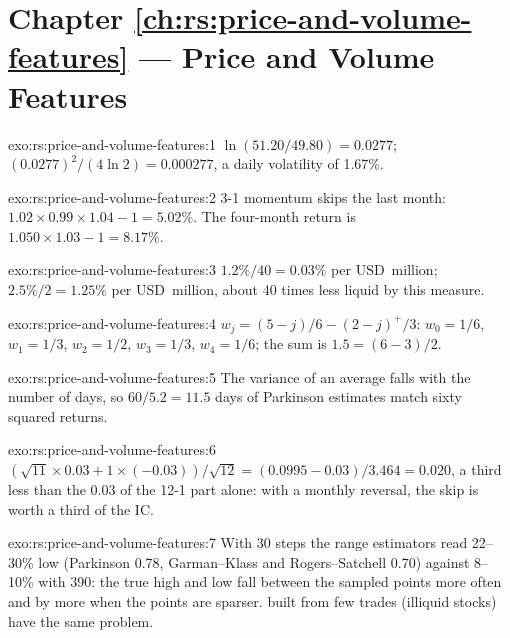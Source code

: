 \section*{Chapter \ref{ch:rs:price-and-volume-features} --- Price and Volume Features}

\begin{solution}{exo:rs:price-and-volume-features:1}
$\ln(51.20/49.80) = 0.0277$; $(0.0277)^2/(4\ln2) = 0.000277$, a daily volatility of 1.67\%.
\end{solution}

\begin{solution}{exo:rs:price-and-volume-features:2}
3-1 momentum skips the last month: $1.02 \times 0.99 \times 1.04 - 1 = 5.02\%$. The four-month return is $1.050 \times 1.03 - 1 = 8.17\%$.
\end{solution}

\begin{solution}{exo:rs:price-and-volume-features:3}
$1.2\%/40 = 0.03\%$ per USD~million; $2.5\%/2 = 1.25\%$ per USD~million, about 40 times less liquid by this measure.
\end{solution}

\begin{solution}{exo:rs:price-and-volume-features:4}
$w_j = (5 - j)/6 - (2 - j)^+/3$: $w_0 = 1/6$, $w_1 = 1/3$, $w_2 = 1/2$, $w_3 = 1/3$, $w_4 = 1/6$; the sum is $1.5 = (6 - 3)/2$.
\end{solution}

\begin{solution}{exo:rs:price-and-volume-features:5}
The variance of an average falls with the number of days, so $60/5.2 = 11.5$ days of Parkinson estimates match sixty squared
returns.
\end{solution}

\begin{solution}{exo:rs:price-and-volume-features:6}
$(\sqrt{11} \times 0.03 + 1 \times (-0.03))/\sqrt{12} = (0.0995 - 0.03)/3.464 = 0.020$, a third less than the 0.03 of the 12-1 part
alone: with a monthly reversal, the skip is worth a third of the IC.
\end{solution}

\begin{solution}{exo:rs:price-and-volume-features:7}
With 30 steps the range estimators read 22--30\% low (Parkinson 0.78, Garman--Klass and Rogers--Satchell 0.70) against 8--10\% with 390:
the true high and low fall between the sampled points more often and by more when the points are sparser.  built from few trades
(illiquid stocks) have the same problem.
\end{solution}

